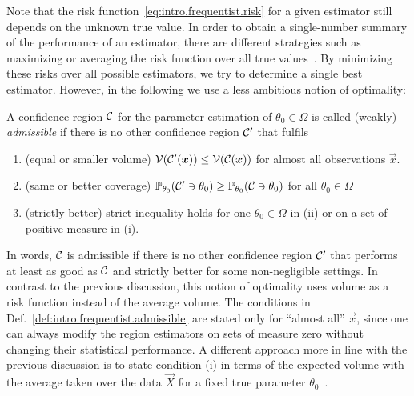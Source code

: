 Note that the risk function~\eqref{eq:intro.frequentist.risk} for a given estimator still depends on the unknown true value.
In order to obtain a single-number summary of the performance of an estimator, there are different strategies such as maximizing or averaging the risk function over all true values~\cite[Sec.\ 12.2]{Wasserman_2013_All}.
By minimizing these risks over all possible estimators, we try to determine a single best estimator.
However, in the following we use a less ambitious notion of optimality:
\begin{definition}{\cite[Def. 2.2]{Joshi_1969_Admissibility}}
  \label{def:intro.frequentist.admissible}
  A confidence region $\mathcal{C}$ for the parameter estimation of $\theta_0 \in \Omega$ is called (weakly) \emph{admissible} if there is no other confidence region $\mathcal{C}'$ that fulfils
  \begin{enumerate}
    \item(equal or smaller volume) $\mathcal{V}(\mathcal{C}'({\boldsymbol{x}})) \le \mathcal{V}(\mathcal{C}({\boldsymbol{x}}))$ for almost all observations $\vec x$.
    \item(same or better coverage) $\mathbb{P}_{\theta_0}(\mathcal{C}' \owns \theta_0) \ge \mathbb{P}_{\theta_0}(\mathcal{C} \owns \theta_0)$ for all $\theta_0 \in \Omega$
    \item(strictly better) strict inequality holds for one $\theta_0 \in \Omega$ in (ii) or on a set of positive measure in (i).
  \end{enumerate}
\end{definition}
In words, $\mathcal{C}$ is admissible if there is no other confidence region $\mathcal{C}'$ that performs at least as good as $\mathcal{C}$ and strictly better for some non-negligible settings.
In contrast to the previous discussion, this notion of optimality uses  volume as a risk function instead of the average volume.
The conditions in Def.~\ref{def:intro.frequentist.admissible} are stated only for ``almost all'' $\vec x$, since one can always modify the region estimators on sets of measure zero without changing their statistical performance.
A different approach more in line with the previous discussion is to state condition (i) in terms of the expected volume with the average taken over the data $\vec X$ for a fixed true parameter $\theta_0$~\cite[Def.~7.1]{Joshi_1969_Admissibility}.



